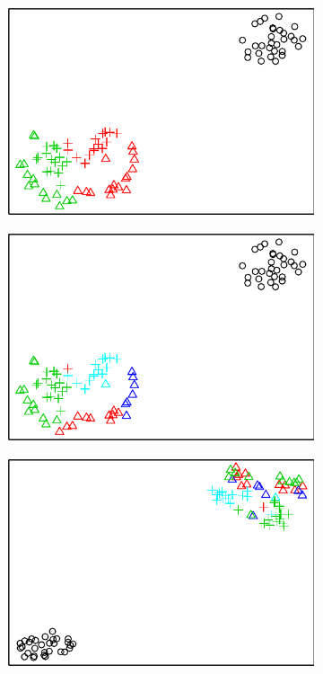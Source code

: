 \begin{figure}[H]
\begin{subfigure}{.49\textwidth}
\includegraphics[width=\textwidth]{../simulation/plots/overclus_a}
\caption{}
\end{subfigure}
\begin{subfigure}{.49\textwidth}
\includegraphics[width=\textwidth]{../simulation/plots/overclus_b}
\caption{}
\end{subfigure}
\begin{subfigure}{.49\textwidth}
\includegraphics[width=\textwidth]{../simulation/plots/overclus_d}

\end{subfigure}
\end{figure}

